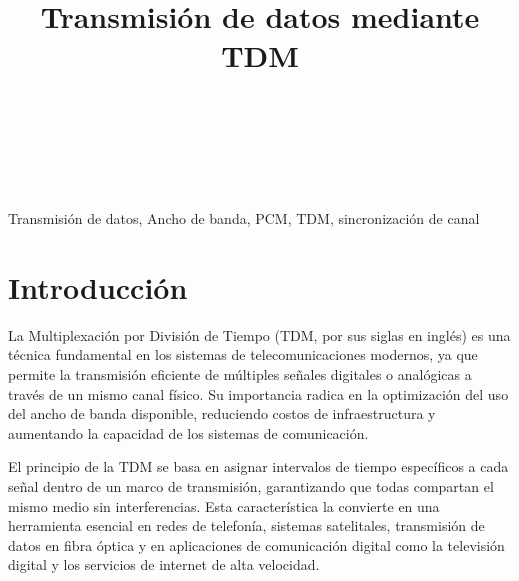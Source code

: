 \documentclass[conference]{IEEEtran}
\begin{document}
	
	\title{Transmisión de datos mediante TDM}
	\author{
		\\
		\\
		\\
		\and
		\and
	}
	
	\maketitle
	\begin{abstract}
		
	\end{abstract}
	\begin{IEEEkeywords}
		Transmisión de datos, Ancho de banda, PCM, TDM, sincronización de canal
	\end{IEEEkeywords}
	
	\section{Introducción}
	
	La Multiplexación por División de Tiempo (TDM, por sus siglas en inglés) es una técnica fundamental en los sistemas de telecomunicaciones modernos, ya que permite la transmisión eficiente de múltiples señales digitales o analógicas a través de un mismo canal físico. Su importancia radica en la optimización del uso del ancho de banda disponible, reduciendo costos de infraestructura y aumentando la capacidad de los sistemas de comunicación.
	
	El principio de la TDM se basa en asignar intervalos de tiempo específicos a cada señal dentro de un marco de transmisión, garantizando que todas compartan el mismo medio sin interferencias. Esta característica la convierte en una herramienta esencial en redes de telefonía, sistemas satelitales, transmisión de datos en fibra óptica y en aplicaciones de comunicación digital como la televisión digital y los servicios de internet de alta velocidad.
	
\end{document}
